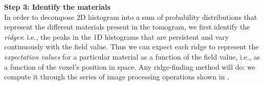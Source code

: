 \documentclass[pdflatex,sn-mathphys]{sn-jnl}%
\theoremstyle{thmstyleone}%
\theoremstyle{thmstyletwo}%
\theoremstyle{thmstylethree}%
\begin{document}
\vspace{\baselineskip}
\noindent\textbf{Step 3: Identify the materials} \\
In order to decompose 2D histogram into a sum of probability distributions that represent
the different materials present in the tomogram, we first identify the {\em ridges}:
i.e., the peaks in the 1D histograms that are persistent and vary continuously with the field value.
Thus we can expect each ridge to represent the {\em expectation values} for a particular material
as a function of the field value, i.e., as a function of the voxel's position in space.
%
Any ridge-finding method will do: we compute it through the series of image processing operations shown in
.

\end{document}
